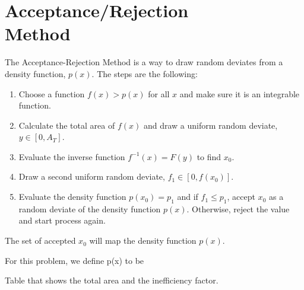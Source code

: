 \section{Acceptance/Rejection \\Method}
The Acceptance-Rejection Method is a way to draw random deviates from a density function, $p(x)$. The steps are the following:
\begin{enumerate}
    \item Choose a function $f(x) > p(x)$ for all $x$ and make sure it is an integrable function.
    \item Calculate the total area of $f(x)$ and draw a uniform random deviate,$y \in [0,A_T]$.
    \item Evaluate the inverse function $f^{-1}(x)=F(y)$ to find $x_0$.
    \item Draw a second uniform random deviate, $f_1 \in[0,f(x_0)]$.
    \item Evaluate the density function $p(x_0)=p_1$ and if $f_1\leq p_1$, accept $x_0$ as a random deviate of the density function $p(x)$. Otherwise, reject the value and start process again.
\end{enumerate}

The set of accepted $x_0$ will map the density function $p(x)$. 


For this problem, we define p(x) to be 





\begin{table}
    \centering
    
    \caption{Table that shows the total area and the inefficiency factor.}
    \label{tab:accRej}
\end{table}

